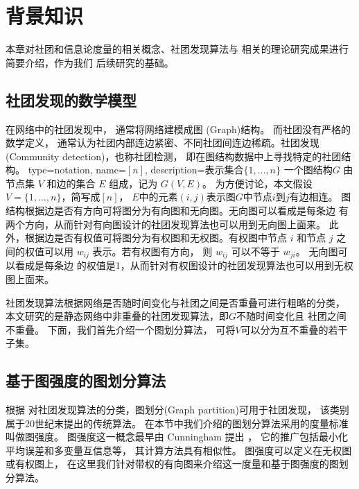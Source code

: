 
\chapter{背景知识}\label{chp:knowledge}
本章对社团和信息论度量的相关概念、社团发现算法与
相关的理论研究成果进行简要介绍，作为我们
后续研究的基础。
\section{社团发现的数学模型}\label{sec:community_detection}

在网络中的社团发现中，
通常将网络建模成图 (Graph)结构。
而社团没有严格的数学定义，
通常认为社团内部连边紧密、不同社团间连边稀疏。社团发现 (Community detection)，也称社团检测，
即在图结构数据中上寻找特定的社团结构。
{
  type=notation,
  name={\ensuremath{[n]}},
  description={表示集合$\{1,\dots, n\}$}
}
一个图结构$G$ 由节点集 $V$ 和边的集合 $E$ 组成，记为 $G(V,E)$。
为方便讨论，本文假设$V=\{1,\dots, n\}$，简写成$[n]$，
$E$中的元素$(i,j)$表示图$G$中节点$i$到$j$有边相连。
图结构根据边是否有方向可将图分为有向图和无向图。无向图可以看成是每条边
有两个方向，从而针对有向图设计的社团发现算法也可以用到无向图上面来。
此外，根据边是否有权值可将图分为有权图和无权图。有权图中节点 $i$
和节点 $j$ 之间的权值可以用 $w_{ij}$ 表示。若有权图有方向，
则 $w_{ij}$ 可以不等于 $w_{ji}$。
无向图可以看成是每条边
的权值是1，从而针对有权图设计的社团发现算法也可以用到无权图上面来。

社团发现算法根据网络是否随时间变化与社团之间是否重叠可进行粗略的分类，
本文研究的是静态网络中非重叠的社团发现算法，即$G$不随时间变化且
社团之间不重叠。
下面，我们首先介绍一个图划分算法，
可将$V$可以分为互不重叠的若干子集。

\section{基于图强度的图划分算法}\label{sec:graph_strength}
根据\citet{fortunato2010community} 对社团发现算法的分类，图划分(Graph partition)可用于社团发现，
该类别属于20世纪末提出的传统算法。
在本节中我们介绍的图划分算法采用的度量标准叫做图强度。
图强度这一概念最早由 Cunningham 提出 \cite{cunningham1985optimal}，
它的推广包括最小化平均误差\cite{mac}和多变量互信息\cite{chan2016ic}等，
其计算方法具有相似性。
图强度可以定义在无权图或有权图上，
在这里我们针对带权的有向图来介绍这一度量和基于图强度的图划分算法。

